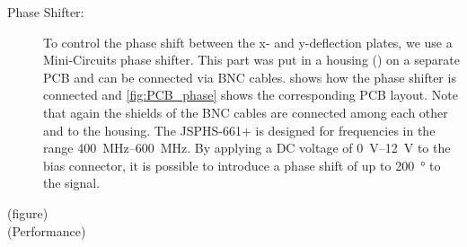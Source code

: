 \begin{description}
	\item[Phase Shifter:] To control the phase shift between the x- and y-deflection plates, we use a Mini-Circuits \cite{JSPHS-661} phase shifter. This part was put in a  housing (\cite{Hammond1455D601RD}) on a separate PCB and can be connected via BNC cables.  shows how the phase shifter is connected and \cref{fig:PCB_phase} shows the corresponding PCB layout. Note that again the shields of the BNC cables are connected among each other and to the housing. The JSPHS-661+ is designed for frequencies in the range \SIrange{400}{600}{\mega\hertz}. By applying a DC voltage of \SIrange{0}{12}{\volt} to the bias connector, it is possible to introduce a phase shift of up to \SI{200}{\degree} to the signal.
	
\end{description}

(figure)\\
(Performance)


